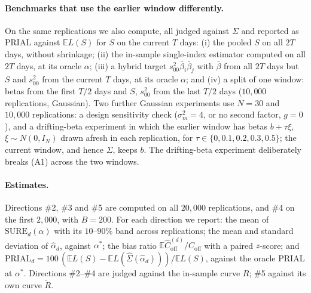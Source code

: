 \documentclass[11pt]{article}
\theoremstyle{remark}
\begin{document}
\paragraph{Benchmarks that use the earlier window differently.} On the same replications we also compute, all judged against $\Sigma$ and reported as PRIAL against $\mathbb{E}L(S)$ for $S$ on the current $T$ days: (i) the pooled $S$ on all $2T$ days, without shrinkage; (ii) the in-sample single-index estimator computed on all $2T$ days, at its oracle $\alpha$; (iii) a hybrid target $s_{00}^2\bar\beta_i\bar\beta_j$ with $\bar\beta$ from all $2T$ days but $S$ and $s_{00}^2$ from the current $T$ days, at its oracle $\alpha$; and (iv) a split of one window: betas from the first $T/2$ days and $S$, $s_{00}^2$ from the last $T/2$ days ($10{,}000$ replications, Gaussian). Two further Gaussian experiments use $N = 30$ and $10{,}000$ replications: a design sensitivity check ($\sigma_m^2 = 4$, or no second factor, $g = 0$), and a drifting-beta experiment in which the earlier window has betas $b + \tau\xi$, $\xi \sim N(0, I_N)$ drawn afresh in each replication, for $\tau \in \{0, 0.1, 0.2, 0.3, 0.5\}$; the current window, and hence $\Sigma$, keeps $b$. The drifting-beta experiment deliberately breaks (A1) across the two windows.

\paragraph{Estimates.} Directions \#2, \#3 and \#5 are computed on all $20{,}000$ replications, and \#4 on the first $2{,}000$, with $B = 200$. For each direction we report: the mean of $\mathrm{SURE}_d(\alpha)$ with its $10$--$90\%$ band across replications; the mean and standard deviation of $\hat\alpha_d$, against $\alpha^*$; the bias ratio $\mathbb{E}\hat C^{(d)}_{\mathrm{off}}/C_{\mathrm{off}}$ with a paired $z$-score; and $\mathrm{PRIAL}_d = 100\,(\mathbb{E}L(S) - \mathbb{E}L(\hat\Sigma(\hat\alpha_d)))/\mathbb{E}L(S)$, against the oracle PRIAL at $\alpha^*$. Directions \#2--\#4 are judged against the in-sample curve $R$; \#5 against its own curve $\tilde R$.
\end{document}
